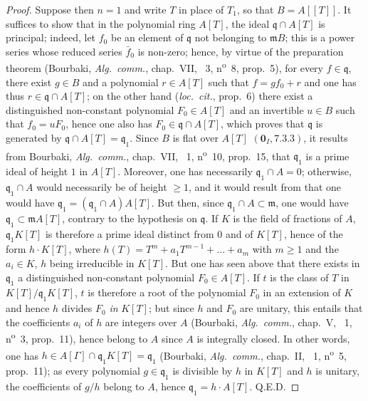 \begin{proof}
Suppose then $n=1$ and write $T$ in place of $T_1$, so that $B=A[[T]]$.
It suffices to show that in the polynomial ring $A[T]$, the ideal $\mathfrak{q}\cap A[T]$ is principal; indeed, let $f_0$ be an element of $\mathfrak{q}$ not belonging to $\mathfrak{m}B$; this is a power series whose reduced series $\bar{f}_0$ is non-zero; hence, by virtue of the preparation theorem (Bourbaki, \emph{Alg.\ comm.}, chap.~VII, \textsection~3, n\textsuperscript{o}~8, prop.~5), for every $f\in\mathfrak{q}$, there exist $g\in B$ and a polynomial $r\in A[T]$ such that $f=gf_0+r$ and one has thus $r\in\mathfrak{q}\cap A[T]$; on the other hand (\emph{loc.\ cit.}, prop.~6) there exist a distinguished non-constant polynomial $F_0\in A[T]$ and an invertible $u\in B$ such that $f_0=uF_0$, hence one also has $F_0\in\mathfrak{q}\cap A[T]$, which proves that $\mathfrak{q}$ is generated by $\mathfrak{q}\cap A[T]=\mathfrak{q}_1$.
Since $B$ is flat over $A[T]$ $(\mathbf{0}_I, 7.3.3)$, it results from Bourbaki, \emph{Alg.\ comm.}, chap.~VII, \textsection~1, n\textsuperscript{o}~10, prop.~15, that $\mathfrak{q}_1$ is a prime ideal of height $1$ in $A[T]$.
Moreover, one has necessarily $\mathfrak{q}_1\cap A=0$; otherwise, $\mathfrak{q}_1\cap A$ would necessarily be of height $\geq 1$, and it would result from  that one would have $\mathfrak{q}_1=(\mathfrak{q}_1\cap A)A[T]$.
But then, since $\mathfrak{q}_1\cap A\subset\mathfrak{m}$, one would have $\mathfrak{q}_1\subset\mathfrak{m}A[T]$, contrary to the hypothesis on $\mathfrak{q}$.
If $K$ is the field of fractions of $A$, $\mathfrak{q}_1K[T]$ is therefore a prime ideal distinct from $0$ and of $K[T]$, hence of the form $h\cdot K[T]$, where $h(T)=T^m+a_1T^{m-1}+\ldots+a_m$ with $m\geq 1$ and the $a_i\in K$, $h$ being irreducible in $K[T]$.
But one has seen above that there exists in $\mathfrak{q}_1$ a distinguished non-constant polynomial $F_0\in A[T]$.
If $t$ is the class of $T$ in $K[T]/\mathfrak{q}_1K[T]$, $t$ is therefore a root of the polynomial $F_0$ in an extension of $K$ and hence $h$ divides $F_0$ \emph{in} $K[T]$; but since $h$ and $F_0$ are unitary, this entails that the coefficients $a_i$ of $h$ are integers over $A$ (Bourbaki, \emph{Alg.\ comm.}, chap.~V, \textsection~1, n\textsuperscript{o}~3, prop.~11), hence belong to $A$ since $A$ is integrally closed.
In other words, one has $h\in A[\Gamma]\cap\mathfrak{q}_1K[T]=\mathfrak{q}_1$ (Bourbaki, \emph{Alg.\ comm.}, chap.~II, \textsection~1, n\textsuperscript{o}~5, prop.~11); as every polynomial $g\in\mathfrak{q}_1$ is divisible by $h$ in $K[T]$ and $h$ is unitary, the coefficients of $g/h$ belong to $A$, hence $\mathfrak{q}_1=h\cdot A[T]$.
Q.E.D.
\end{proof}

